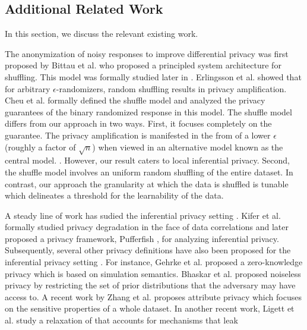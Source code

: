 \subsection{Additional Related Work}\label{app:related}
In this section, we discuss the relevant existing work. \par  The anonymization of noisy responses  to improve differential privacy was first proposed by Bittau et al. \cite{Bittau2017} who proposed a principled system architecture for shuffling. This model was formally studied later in \cite{shuffling1, shuffle2}. Erlingsson et al. \cite{shuffling1} showed that for arbitrary $\epsilon$-\ldp randomizers, random shuffling results in privacy amplification. Cheu et al. \cite{shuffle2} formally defined the shuffle \DP model
and analyzed the privacy guarantees of the binary randomized response in this model.
The shuffle \DP model differs from our approach in  two ways. First, it focuses completely on the \DP guarantee. %
The privacy amplification is manifested in the from of a lower $\epsilon$ (roughly a factor of $\sqrt{n}$) when viewed in an alternative \DP model known as the central \DP model. \cite{shuffling1,shuffle2,blanket,feldman2020hiding,Bittau2017,Balcer2020SeparatingL}.  
However, our result caters to local inferential privacy. Second, the shuffle model involves an uniform random shuffling of the entire dataset. In contrast, our approach the granularity at which the data is shuffled is tunable which delineates a threshold for the learnability of the data. 
\par A steady line of work has sudied the inferential privacy setting \cite{semantics, Kifer,  IP, Dalenius:1977, dwork2010on, sok}. Kifer et al. \cite{Kifer} formally studied privacy degradation in the face of data correlations and later proposed a  privacy framework, Pufferfish \cite{Pufferfish, Song,Blowfish}, for analyzing inferential privacy. Subsequently, several other privacy definitions have also been proposed for the inferential privacy setting \cite{DDP,BDP,correlated,correlated2,CWP}. For instance, Gehrke et al.  proposed a zero-knowledge privacy \cite{ZKPrivacy,crowd} which is based on simulation semantics. Bhaskar et al. proposed  noiseless privacy \cite{noiseless, TNP} by restricting the set of prior
distributions that the adversary may have access to.  A recent work by Zhang et al. proposes attribute privacy \cite{AP} which focuses on the sensitive properties of a whole dataset. In another recent work, Ligett et al. study a relaxation of \DP that accounts for mechanisms that leak
